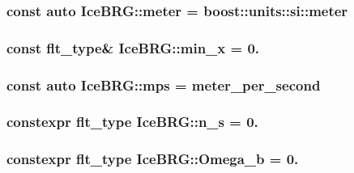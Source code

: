 \subsubsection[{meter}]{\setlength{\rightskip}{0pt plus 5cm}const auto Ice\+B\+R\+G\+::meter = boost\+::units\+::si\+::meter}\label{namespaceIceBRG_aa73b527a69b3a11b2dcb1d5c1b1d5ef1}
\hypertarget{namespaceIceBRG_a2669894c97834b30c36e7a378a161fda}{}
\subsubsection[{min\+\_\+x}]{\setlength{\rightskip}{0pt plus 5cm}const {\bf flt\+\_\+type}\& Ice\+B\+R\+G\+::min\+\_\+x = 0.}\label{namespaceIceBRG_a2669894c97834b30c36e7a378a161fda}
\hypertarget{namespaceIceBRG_ad5f22cbf0896ee33ad84e89b40c7c065}{}
\subsubsection[{mps}]{\setlength{\rightskip}{0pt plus 5cm}const auto Ice\+B\+R\+G\+::mps = {\bf meter\+\_\+per\+\_\+second}}\label{namespaceIceBRG_ad5f22cbf0896ee33ad84e89b40c7c065}
\hypertarget{namespaceIceBRG_a08eb14835ddd7739204fc116ccfff92d}{}
\subsubsection[{n\+\_\+s}]{\setlength{\rightskip}{0pt plus 5cm}constexpr {\bf flt\+\_\+type} Ice\+B\+R\+G\+::n\+\_\+s = 0.}\label{namespaceIceBRG_a08eb14835ddd7739204fc116ccfff92d}
\hypertarget{namespaceIceBRG_a109232f7a7118dd2b89b92a18df26a79}{}
\subsubsection[{Omega\+\_\+b}]{\setlength{\rightskip}{0pt plus 5cm}constexpr {\bf flt\+\_\+type} Ice\+B\+R\+G\+::\+Omega\+\_\+b = 0.}\label{namespaceIceBRG_a109232f7a7118dd2b89b92a18df26a79}
\hypertarget{namespaceIceBRG_afb35c6ac056f6db5d60d8cb03a7b997a}{}
